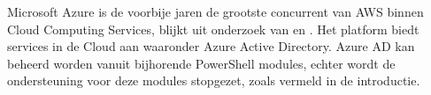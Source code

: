 \begin{comment}

Hier beschrijf je de \emph{state-of-the-art} rondom je gekozen onderzoeksdomein, d.w.z.\ een inleidende, doorlopende tekst over het onderzoeksdomein van je bachelorproef. Je steunt daarbij heel sterk op de professionele \emph{vakliteratuur}, en niet zozeer op populariserende teksten voor een breed publiek. Wat is de huidige stand van zaken in dit domein, en wat zijn nog eventuele open vragen (die misschien de aanleiding waren tot je onderzoeksvraag!)?

Je mag de titel van deze sectie ook aanpassen (literatuurstudie, stand van zaken, enz.). Zijn er al gelijkaardige onderzoeken gevoerd? Wat concluderen ze? Wat is het verschil met jouw onderzoek?

Verwijs bij elke introductie van een term of bewering over het domein naar de vakliteratuur, bijvoorbeeld~\autocite{Hykes2013}! Denk zeker goed na welke werken je refereert en waarom.

Draag zorg voor correcte literatuurverwijzingen! Een bronvermelding hoort thuis \emph{binnen} de zin waar je je op die bron baseert, dus niet er buiten! Maak meteen een verwijzing als je gebruik maakt van een bron. Doe dit dus \emph{niet} aan het einde van een lange paragraaf. Baseer nooit teveel aansluitende tekst op eenzelfde bron.

Als je informatie over bronnen verzamelt in JabRef, zorg er dan voor dat alle nodige info aanwezig is om de bron terug te vinden (zoals uitvoerig besproken in de lessen Research Methods).


Je mag deze sectie nog verder onderverdelen in subsecties als dit de structuur van de tekst kan verduidelijken.

\end{comment}

Microsoft Azure is de voorbije jaren de grootste concurrent van AWS binnen Cloud Computing Services, blijkt uit onderzoek van \textcite{Vailshery2022} en \textcite{SRG2022}. Het platform biedt services in de Cloud aan waaronder Azure Active Directory. Azure AD kan beheerd worden vanuit bijhorende PowerShell modules, echter wordt de ondersteuning voor deze modules stopgezet, zoals vermeld in de introductie. \\

